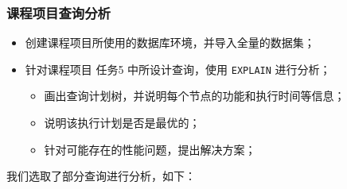\documentclass{article}
\renewcommand\tt{\texttt}
\begin{document}
\subsubsection{课程项目查询分析}

\begin{itemize}
  \item 创建课程项目所使用的数据库环境，并导入全量的数据集；
  \item 针对课程项目 任务5 中所设计查询，使用 \tt{EXPLAIN} 进行分析；
  \begin{itemize}[label=\(\circ\)]
    \item 画出查询计划树，并说明每个节点的功能和执行时间等信息；
    \item 说明该执行计划是否是最优的；
    \item 针对可能存在的性能问题，提出解决方案；
  \end{itemize}
\end{itemize}

我们选取了部分查询进行分析，如下：
\end{document}
